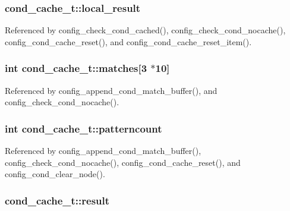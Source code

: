 \hypertarget{structcond__cache__t_a9440c923dcf44190cf5aa9eaa89fa685}{
\subsubsection[{local\-\_\-result}]{ cond\-\_\-cache\-\_\-t\-::local\-\_\-result}}\label{structcond__cache__t_a9440c923dcf44190cf5aa9eaa89fa685}


Referenced by config\-\_\-check\-\_\-cond\-\_\-cached(), config\-\_\-check\-\_\-cond\-\_\-nocache(), config\-\_\-cond\-\_\-cache\-\_\-reset(), and config\-\_\-cond\-\_\-cache\-\_\-reset\-\_\-item().

\hypertarget{structcond__cache__t_a9ff6f9f4f11a06b34fdc0160990d5f72}{
\subsubsection[{matches}]{\setlength{\rightskip}{0pt plus 5cm}int cond\-\_\-cache\-\_\-t\-::matches\mbox{[}3 $\ast$10\mbox{]}}}\label{structcond__cache__t_a9ff6f9f4f11a06b34fdc0160990d5f72}


Referenced by config\-\_\-append\-\_\-cond\-\_\-match\-\_\-buffer(), and config\-\_\-check\-\_\-cond\-\_\-nocache().

\hypertarget{structcond__cache__t_a5400d839ef7de66f5b61f2fc8130c8ca}{
\subsubsection[{patterncount}]{\setlength{\rightskip}{0pt plus 5cm}int cond\-\_\-cache\-\_\-t\-::patterncount}}\label{structcond__cache__t_a5400d839ef7de66f5b61f2fc8130c8ca}


Referenced by config\-\_\-append\-\_\-cond\-\_\-match\-\_\-buffer(), config\-\_\-check\-\_\-cond\-\_\-nocache(), config\-\_\-cond\-\_\-cache\-\_\-reset(), and config\-\_\-cond\-\_\-clear\-\_\-node().

\hypertarget{structcond__cache__t_a2102a66d0a72126a6dba43d13c067d29}{
\subsubsection[{result}]{ cond\-\_\-cache\-\_\-t\-::result}}\label{structcond__cache__t_a2102a66d0a72126a6dba43d13c067d29}


